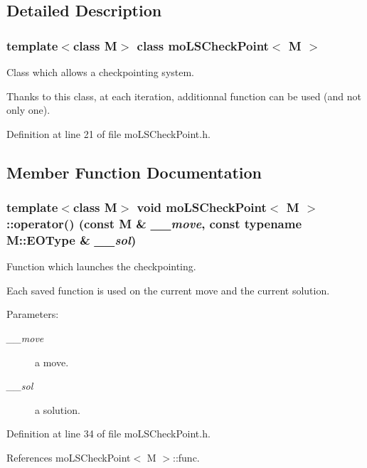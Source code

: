 \subsection{Detailed Description}
\subsubsection*{template$<$class M$>$ class mo\-LSCheck\-Point$<$ M $>$}

Class which allows a checkpointing system. 

Thanks to this class, at each iteration, additionnal function can be used (and not only one). 



Definition at line 21 of file mo\-LSCheck\-Point.h.

\subsection{Member Function Documentation}
\subsubsection{\setlength{\rightskip}{0pt plus 5cm}template$<$class M$>$ void {\bf mo\-LSCheck\-Point}$<$ M $>$::operator() (const M \& {\em \_\-\_\-move}, const typename M::EOType \& {\em \_\-\_\-sol})\hspace{0.3cm}{\tt  [inline]}}\label{classmo_l_s_check_point_2f9c1250279e3f49ec77a66c10029f1e}


Function which launches the checkpointing. 

Each saved function is used on the current move and the current solution.

\begin{Desc}
\item[Parameters:]
\begin{description}
\item[{\em \_\-\_\-move}]a move. \item[{\em \_\-\_\-sol}]a solution. \end{description}
\end{Desc}


Definition at line 34 of file mo\-LSCheck\-Point.h.

References mo\-LSCheck\-Point$<$ M $>$::func.
